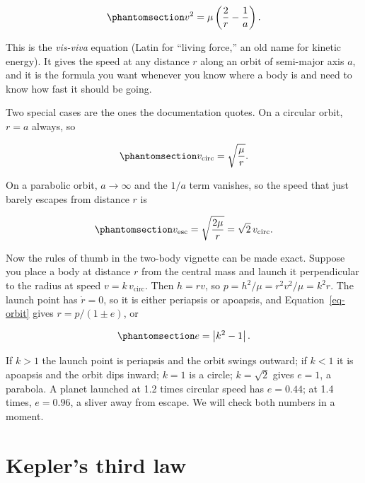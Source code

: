 \documentclass[
  10.5pt,
  letterpaper,
]{scrbook}
\theoremstyle{definition}
\theoremstyle{plain}
\theoremstyle{remark}
\begin{document}
\begin{equation}\protect\phantomsection\label{eq-vis-viva}{
v^2 = \mu\left(\frac{2}{r} - \frac{1}{a}\right).
}\end{equation}

This is the \emph{vis-viva} equation (Latin for ``living force,'' an old
name for kinetic energy). It gives the speed at any distance \(r\) along
an orbit of semi-major axis \(a\), and it is the formula you want
whenever you know where a body is and need to know how fast it should be
going.

Two special cases are the ones the documentation quotes. On a circular
orbit, \(r = a\) always, so

\begin{equation}\protect\phantomsection\label{eq-v-circ}{
v_{\mathrm{circ}} = \sqrt{\frac{\mu}{r}}.
}\end{equation}

On a parabolic orbit, \(a \to \infty\) and the \(1/a\) term vanishes, so
the speed that just barely escapes from distance \(r\) is

\begin{equation}\protect\phantomsection\label{eq-v-esc}{
v_{\mathrm{esc}} = \sqrt{\frac{2\mu}{r}} = \sqrt{2}\,v_{\mathrm{circ}}.
}\end{equation}

Now the rules of thumb in the two-body vignette can be made exact.
Suppose you place a body at distance \(r\) from the central mass and
launch it perpendicular to the radius at speed
\(v = k\,v_{\mathrm{circ}}\). Then \(h = rv\), so
\(p = h^2/\mu = r^2v^2/\mu = k^2 r\). The launch point has
\(\dot{r} = 0\), so it is either periapsis or apoapsis, and
Equation~\ref{eq-orbit} gives \(r = p/(1\pm e)\), or

\begin{equation}\protect\phantomsection\label{eq-e-from-k}{
e = \left|k^2 - 1\right|.
}\end{equation}

If \(k > 1\) the launch point is periapsis and the orbit swings outward;
if \(k < 1\) it is apoapsis and the orbit dips inward; \(k = 1\) is a
circle; \(k = \sqrt{2}\) gives \(e = 1\), a parabola. A planet launched
at 1.2 times circular speed has \(e = 0.44\); at 1.4 times,
\(e = 0.96\), a sliver away from escape. We will check both numbers in a
moment.

\section{Kepler's third law}\label{keplers-third-law}
\end{document}
